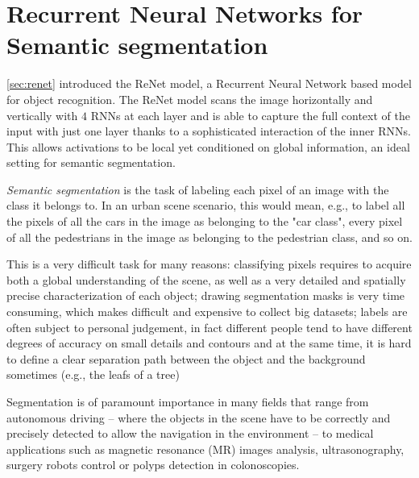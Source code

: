 \chapter{Recurrent Neural Networks for Semantic segmentation}\label{sec:reseg}

\autoref{sec:renet} introduced the ReNet model, a Recurrent Neural Network
based model for object recognition. The ReNet model scans the image
horizontally and vertically with $4$ RNNs at each layer and is able to capture
the full context of the input with just one layer thanks to a sophisticated
interaction of the inner RNNs. This allows activations to be local yet
conditioned on global information, an ideal setting for semantic segmentation.

\emph{Semantic segmentation} is the task of labeling each pixel of an image
with the class it belongs to. In an urban scene scenario, this would mean,
e.g., to label all the pixels of all the cars in the image as belonging to the
"car class", every pixel of all the pedestrians in the image as belonging to
the pedestrian class, and so on.

This is a very difficult task for many reasons: classifying pixels requires to
acquire both a global understanding of the scene, as well as a very detailed
and spatially precise characterization of each object; drawing segmentation
masks is very time consuming, which makes difficult and expensive to collect
big datasets; labels are often subject to personal judgement, in fact different
people tend to have different degrees of accuracy on small details and
contours and at the same time, it is hard to define a clear separation path
between the object and the background sometimes (e.g., the leafs of a tree)

Segmentation is of paramount importance in many fields that range from
autonomous driving -- where the objects in the scene have to be correctly and
precisely detected to allow the navigation in the environment -- to medical
applications such as magnetic resonance (MR) images analysis, ultrasonography,
surgery robots control or polyps detection in colonoscopies.

